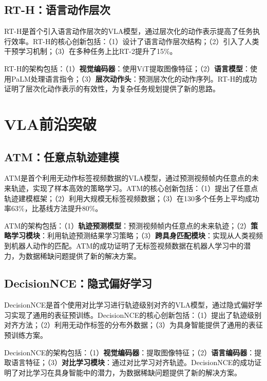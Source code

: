 \documentclass[12pt,a4paper]{article}
\begin{document}
\subsection{RT-H：语言动作层次}

RT-H\cite{rth}是首个引入语言动作层次的VLA模型，通过层次化的动作表示提高了任务执行效率。RT-H的核心创新包括：（1）设计了语言动作层次结构；（2）引入了人类干预学习机制；（3）在多种任务上比RT-2提升了15\%。

RT-H的架构包括：（1）\textbf{视觉编码器}：使用ViT提取图像特征；（2）\textbf{语言模型}：使用PaLM处理语言指令；（3）\textbf{层次动作头}：预测层次化的动作序列。RT-H的成功证明了层次化动作表示的有效性，为复杂任务规划提供了新的思路。

\section{VLA前沿突破}

\subsection{ATM：任意点轨迹建模}

ATM\cite{atm}是首个利用无动作标签视频数据的VLA模型，通过预测视频帧内任意点的未来轨迹，实现了样本高效的策略学习。ATM的核心创新包括：（1）提出了任意点轨迹建模框架；（2）利用大规模无标签视频数据；（3）在130多个任务上平均成功率63\%，比基线方法提升80\%。

ATM的架构包括：（1）\textbf{轨迹预测模型}：预测视频帧内任意点的未来轨迹；（2）\textbf{策略学习模块}：利用轨迹预测结果学习策略；（3）\textbf{跨具身匹配模块}：实现从人类视频到机器人动作的匹配。ATM的成功证明了无标签视频数据在机器人学习中的潜力，为数据稀缺问题提供了新的解决方案。

\subsection{DecisionNCE：隐式偏好学习}

DecisionNCE\cite{decisionnce}是首个使用对比学习进行轨迹级别对齐的VLA模型，通过隐式偏好学习实现了通用的表征预训练。DecisionNCE的核心创新包括：（1）提出了轨迹级别对齐方法；（2）利用无动作标签的分布外数据；（3）为具身智能提供了通用的表征预训练方案。

DecisionNCE的架构包括：（1）\textbf{视觉编码器}：提取图像特征；（2）\textbf{语言编码器}：提取语言特征；（3）\textbf{对比学习模块}：通过对比学习对齐轨迹。DecisionNCE的成功证明了对比学习在具身智能中的潜力，为数据稀缺问题提供了新的解决方案。
\end{document}
